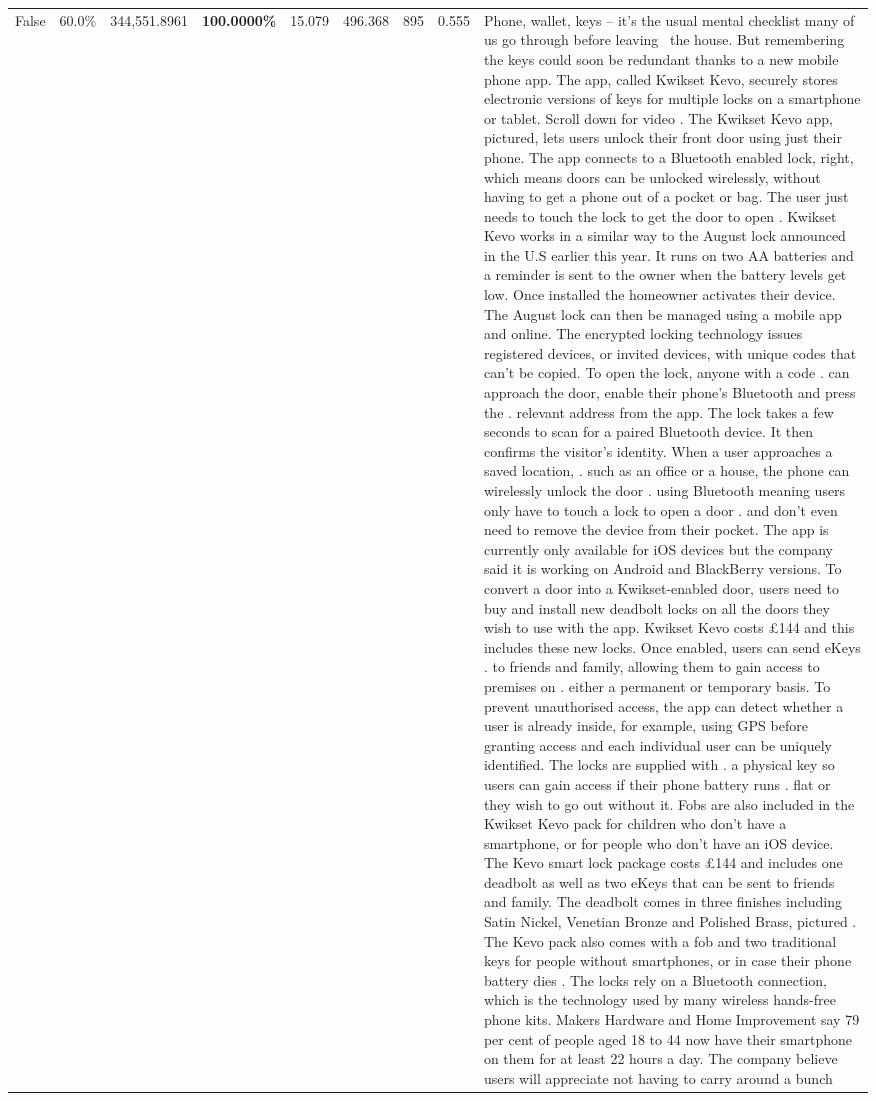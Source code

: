 \begin{table}[H]
\begin{tabular}{lllrlllll}
False & 60.0\% & 344,551.8961 & \bfseries \color{red} 100.0000\% & 15.079 & 496.368 & 895 & 0.555 & Phone, wallet, keys – it’s the usual mental checklist many of us go through before leaving  the house. But remembering the keys could soon be redundant thanks to a new mobile phone app. The app, called Kwikset Kevo, securely stores electronic versions of keys for multiple locks on a smartphone or tablet. Scroll down for video . The Kwikset Kevo app, pictured, lets users unlock their front door using just their phone. The app connects to a Bluetooth enabled lock, right, which means doors can be unlocked wirelessly, without having to get a phone out of a pocket or bag. The user just needs to touch the lock to get the door to open . Kwikset Kevo works in a similar way to the August lock announced in the U.S earlier this year. It runs on two AA batteries and a reminder is sent to the owner when the battery levels get low. Once installed the homeowner activates their device. The August lock can then be managed using a mobile app and online. The encrypted locking technology issues registered devices, or invited devices, with unique codes that can't be copied. To open the lock, anyone with a code . can approach the door, enable their phone's Bluetooth and press the . relevant address from the app. The lock takes a few seconds to scan for a paired Bluetooth device. It then confirms the visitor's identity. When a user approaches a saved location, . such as an office or a house, the phone can wirelessly unlock the door . using Bluetooth meaning users only have to touch a lock to open a door . and don't even need to remove the device from their pocket. The app is currently only available for iOS devices but the company said it is working on Android and BlackBerry versions. To convert a door into a Kwikset-enabled door, users need to buy and install new deadbolt locks on all the doors they wish to use with the app. Kwikset Kevo costs £144 and this includes these new locks. Once enabled, users can send eKeys . to friends and family, allowing them to gain access to premises on . either a permanent or temporary basis. To prevent unauthorised access, the app can detect whether a user is already inside, for example, using GPS before granting access and each individual user can be uniquely identified. The locks are supplied with . a physical key so users can gain access if their phone battery runs . flat or they wish to go out without it. Fobs are also included in the Kwikset Kevo pack for children who don't have a smartphone, or for people who don't have an iOS device. The Kevo smart lock package costs £144 and includes one deadbolt as well as two eKeys that can be sent to friends and family. The deadbolt comes in three finishes including Satin Nickel, Venetian Bronze and Polished Brass, pictured . The Kevo pack also comes with a fob and two traditional keys for people without smartphones, or in case their phone battery dies . The locks rely on a Bluetooth connection, which is the technology used by many wireless hands-free phone kits. Makers Hardware and Home Improvement say 79 per cent of people aged 18 to 44 now have their smartphone on them for at least 22 hours a day. The company believe users will appreciate not having to carry around a bunch 
\end{tabular}
\end{table}
